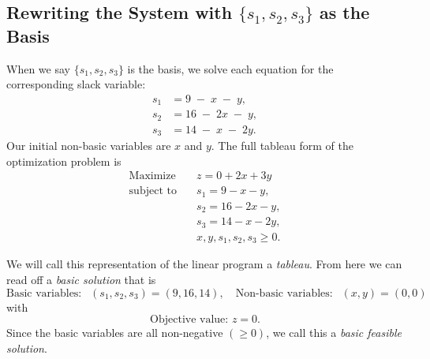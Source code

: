 \subsection*{Rewriting the System with \(\{s_1,s_2,s_3\}\) as the Basis}

When we say \(\{s_1,s_2,s_3\}\) is the basis, we solve each equation for the corresponding slack variable:
\[
\begin{aligned}
s_1 &= 9 \;-\; x \;-\; y, \\[6pt]
s_2 &= 16 \;-\; 2x \;-\; y,\\[6pt]
s_3 &= 14 \;-\; x \;-\; 2y.
\end{aligned}
\]
 Our initial non-basic variables are $x$ and $y$. The full tableau form of the optimization problem is
\[
\begin{aligned}
\text{Maximize}\quad 
& z = 0 + 2x + 3y \\
\text{subject to}\quad 
& s_1 = 9 - x - y, \\
& s_2 = 16 - 2x - y, \\
& s_3 = 14 - x - 2y , \\
& x, y, s_1, s_2, s_3 \ge 0.
\end{aligned}
\]

We will call this representation of the linear program a \emph{tableau}.  From here we can read off a \emph{basic solution} that is 
$$
\text{Basic variables: } \ \ (s_1, s_2, s_3) = (9, 16,14),  \quad \text{Non-basic variables:  } \ \ (x,y) = (0,0)
$$
with 
$$
\text{Objective value: } z = 0.
$$
Since the basic variables are all non-negative $(\geq 0)$, we call this a \emph{basic feasible solution}.



